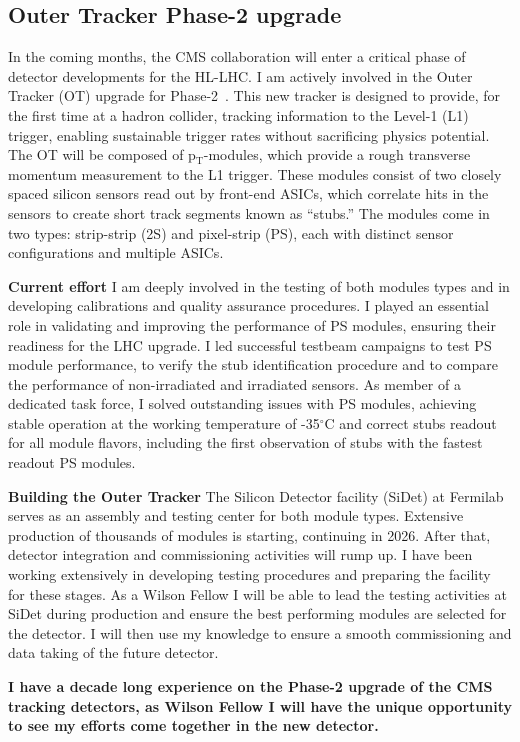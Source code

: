 {\begin{flushleft}
\subsection{Outer Tracker Phase-2 upgrade}
\vskip 5pt 
In the coming months, the CMS collaboration will enter a critical phase of detector developments for the HL-LHC. I am actively involved in the Outer Tracker (OT) upgrade for Phase-2~\cite{[5]}. This new tracker is designed to provide, for the first time at a hadron collider, tracking information to the Level-1 (L1) trigger, enabling sustainable trigger rates without sacrificing physics potential. The OT will be composed of p$_{\mathrm{T}}$-modules, which provide a rough transverse momentum measurement to the L1 trigger. These modules consist of two closely spaced silicon sensors read out by front-end ASICs, which correlate hits in the sensors to create short track segments known as ``stubs.'' The modules come in two types: strip-strip (2S) and pixel-strip (PS), each with distinct sensor configurations and multiple ASICs.

\textbf{Current effort}
I am deeply involved in the testing of both modules types and in developing calibrations and quality assurance procedures. I played an essential role in validating and improving the performance of PS modules, ensuring their readiness for the LHC upgrade. I led successful testbeam campaigns to test PS module performance, to verify the stub identification procedure and to compare the performance of non-irradiated and irradiated sensors. As member of a dedicated task force, I solved outstanding issues with PS modules, achieving stable operation at the working temperature of -35$^{\circ}$C and correct stubs readout for all module flavors, including the first observation of stubs with the fastest readout PS modules.  

\textbf{Building the Outer Tracker}
The Silicon Detector facility (SiDet) at Fermilab serves as an assembly and testing center for both module types. Extensive production of thousands of modules is starting, continuing in 2026. After that, detector integration and commissioning activities will rump up. I have been working extensively in developing testing procedures and preparing the facility for these stages. As a Wilson Fellow I will be able to lead the testing activities at SiDet during production and ensure the best performing modules are selected for the detector. I will then use my knowledge to ensure a smooth commissioning and data taking of the future detector.

\textbf{I have a decade long experience on the Phase-2 upgrade of the CMS tracking detectors, as Wilson Fellow I will have the unique opportunity to see my efforts come together in the new detector.} 



\end{flushleft}}
